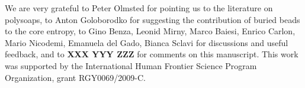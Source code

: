 \documentclass[
preprint,
a4paper,
12pt,
superscriptaddress,
pre]{revtex4}
\begin{document}





\begin{acknowledgments}
  We are very grateful to Peter Olmsted for pointing us to the
  literature on polysoaps, to Anton Goloborodko for suggesting the
  contribution of buried beads to the core entropy, to Gino Benza,
  Leonid Mirny, Marco Baiesi, Enrico Carlon, Mario Nicodemi, Emanuela
  del Gado, Bianca Sclavi
  for discussions and useful feedback, and to \textbf{XXX YYY ZZZ}
  for comments on this manuscript.  This work was supported by the
  International Human Frontier Science Program Organization, grant
  RGY0069/2009-C.
\end{acknowledgments}



    
\end{document}
